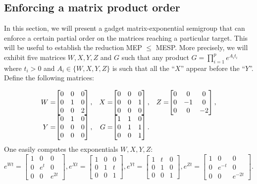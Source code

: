 \subsection{Enforcing a matrix product order}
\label{sec:lics_gadget}

In this section, we will present a gadget matrix-exponential semigroup that can
enforce a certain partial order on the matrices reaching a particular target.
This will be useful to establish the reduction MEP $\leq$ MESP\@.
More precisely, we will exhibit five matrices $W,X,Y,Z$ and $G$ such that any
product $G=\prod_{i=1}^{p} e^{A_{i} t_{i}}$
where $t_{i}>0$ and $A_{i}\in \lbrace W,X,Y,Z \rbrace$ is such that all the ``$X$'' appear before
the ``$Y$''. Define the following matrices:

\[
\begin{array}{r@{}c@{}cr@{}c@{}cr@{}c}
W=&\begin{bmatrix}0&0&0\\0&1&0\\0&0&2\end{bmatrix},&&
X=&\begin{bmatrix}0&0&0\\0&0&1\\0&0&0\end{bmatrix},&&
Z=&\begin{bmatrix}0&0&0\\0&-1&0\\0&0&-2\end{bmatrix},\\
Y=&\begin{bmatrix}0&1&0\\0&0&0\\0&0&0\end{bmatrix},&&
G=&\begin{bmatrix}1&1&0\\0&1&1\\0&0&1\end{bmatrix}.&&&
\end{array}
\]
One easily computes the exponentials $W,X,Y,Z$:
\[
e^{Wt}=\begin{bmatrix}1&0&0\\0&e^t&0\\0&0&e^{2t}\end{bmatrix},
e^{Xt}=\begin{bmatrix}1&0&0\\0&1&t\\0&0&1\end{bmatrix},
e^{Yt}=\begin{bmatrix}1&t&0\\0&1&0\\0&0&1\end{bmatrix},
e^{Zt}=\begin{bmatrix}1&0&0\\0&e^{-t}&0\\0&0&e^{-2t}\end{bmatrix}.
\]

